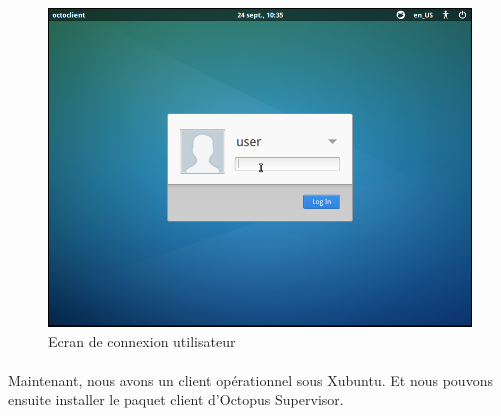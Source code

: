  \begin{figure}[h]
 \centering
 \includegraphics[scale=0.5]{img/install/Xub_inst_7.png}
 \caption{Ecran de connexion utilisateur}
 \end{figure}
 
 \paragraph{}
 Maintenant, nous avons un client opérationnel sous Xubuntu. Et nous pouvons ensuite installer le paquet client d'Octopus Supervisor.
 